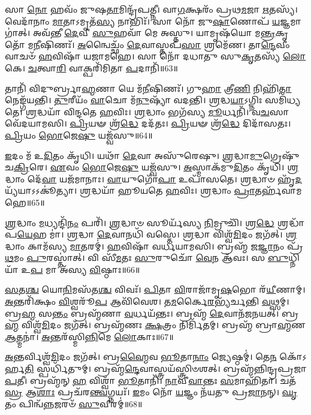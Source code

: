 𑌸𑌾 \ul{𑌨𑍋} 𑌹𑌵𑌂᳴ 𑌜𑍁𑌷\-\ul{𑌤𑌾}\-𑌮𑌿𑌨𑍍𑌦𑍍𑌰᳴𑌪𑌤𑍍𑌨𑍀।
𑌵𑌾\-\ul{𑌗}\-𑌕𑍍𑌷𑌰𑌂᳴ 𑌪𑍍𑌰𑌥\-\ul{𑌮}\-𑌜𑌾 \ul{𑌋}\-𑌤𑌸𑍍𑌯᳴।
𑌵𑍇𑌦𑌾᳴𑌨𑌾𑌂 \ul{𑌮𑌾}\-𑌤𑌾\-𑌽𑌮𑍃𑌤᳴\-\ul{𑌸𑍍𑌯} 𑌨𑌾𑌭𑌿𑌃᳴।
𑌸𑌾 𑌨𑍋᳴ 𑌜𑍁\-\ul{𑌷𑌾}\-𑌣𑍋𑌪᳴ \ul{𑌯}\-𑌜𑍍𑌞𑌮𑌾𑌗𑌾॑𑌤𑍍।
𑌅𑌵᳴𑌨𑍍𑌤𑍀 \ul{𑌦𑍇}\-𑌵𑍀 \ul{𑌸𑍁}\-𑌹𑌵𑌾᳴ 𑌮𑍇 𑌅𑌸𑍍𑌤𑍁।
𑌯𑌾𑌮𑍃𑌷᳴𑌯𑍋 𑌮\-\ul{𑌨𑍍𑌤𑍍𑌰}\-𑌕𑍃𑌤𑍋᳴ 𑌮\-\ul{𑌨𑍀}\-𑌷𑌿𑌣𑌃᳴।
\-\ul{𑌅}\-𑌨𑍍𑌵𑍈𑌚𑍍𑌛𑌂᳴ \ul{𑌦𑍇}\-𑌵𑌾𑌸𑍍𑌤𑌪᳴\-\ul{𑌸𑌾} 𑌶𑍍𑌰𑌮𑍇᳴𑌣।
𑌤𑌾\-\ul{𑌨𑍍𑌦𑍇}\-𑌵𑍀𑌂 𑌵𑌾𑌚𑍞᳴ \ul{𑌹}\-𑌵𑌿𑌷𑌾᳴ 𑌯𑌜𑌾𑌮𑌹𑍇।
𑌸𑌾 𑌨𑍋᳴ 𑌦𑌧𑌾𑌤𑍁 𑌸𑍁\-\ul{𑌕𑍃}\-𑌤𑌸𑍍𑌯᳴ \ul{𑌲𑍋}\-𑌕𑍇।
\-\ul{𑌚}\-𑌤𑍍𑌵𑌾\-\ul{𑌰𑌿} 𑌵𑌾𑌕𑍍𑌪𑌰𑌿᳴𑌮𑌿𑌤𑌾 \ul{𑌪}\-𑌦𑌾𑌨𑌿᳴॥63॥

𑌤𑌾𑌨𑌿᳴ 𑌵𑌿𑌦𑍁𑌰𑍍𑌬𑍍𑌰𑌾\-\ul{𑌹𑍍𑌮}\-𑌣𑌾 𑌯𑍇 𑌮᳴\-\ul{𑌨𑍀}\-𑌷𑌿𑌣𑌃᳴।
𑌗𑍁\-\ul{𑌹𑌾} 𑌤𑍍𑌰𑍀\-\ul{𑌣𑌿} 𑌨𑌿𑌹𑌿᳴\-\ul{𑌤𑌾} 𑌨𑍇𑌙𑍍𑌗᳴𑌯𑌨𑍍𑌤𑌿।
\-\ul{𑌤𑍁}\-𑌰𑍀𑌯𑌂᳴ \ul{𑌵𑌾}\-𑌚𑍋 𑌮᳴\-\ul{𑌨𑍁}\-𑌷𑍍𑌯𑌾᳴ 𑌵𑌦𑌨𑍍𑌤𑌿।
\-\ul{𑌶𑍍𑌰}\-𑌦𑍍𑌧\-\ul{𑌯𑌾}\-\-𑌽𑌗𑍍𑌨𑌿𑌃 𑌸𑌮𑌿᳴𑌧𑍍𑌯𑌤𑍇।
\-\ul{𑌶𑍍𑌰}\-𑌦𑍍𑌧𑌯𑌾᳴ 𑌵𑌿𑌨𑍍𑌦𑌤𑍇 \ul{𑌹}\-𑌵𑌿𑌃।
\-\ul{𑌶𑍍𑌰}\-𑌦𑍍𑌧𑌾𑌂 𑌭𑌗᳴𑌸𑍍𑌯 \ul{𑌮𑍂}\-𑌰𑍍𑌧𑌨𑌿᳴।
𑌵\-\ul{𑌚}\-𑌸𑌾 𑌵𑍇᳴𑌦𑌯𑌾𑌮𑌸𑌿।
\-\ul{𑌪𑍍𑌰𑌿}\-𑌯𑍟 𑌶𑍍𑌰᳴\-\ul{𑌦𑍍𑌧𑍇} 𑌦𑌦᳴𑌤𑌃।
\-\ul{𑌪𑍍𑌰𑌿}\-𑌯𑍟 𑌶𑍍𑌰᳴\-\ul{𑌦𑍍𑌧𑍇} 𑌦𑌿𑌦𑌾᳴𑌸𑌤𑌃।
\-\ul{𑌪𑍍𑌰𑌿}\-𑌯𑌂 \ul{𑌭𑍋}\-𑌜𑍇\-\ul{𑌷𑍁} 𑌯𑌜𑍍𑌵᳴𑌸𑍁॥64॥

\-\ul{𑌇}\-𑌦𑌂 𑌮᳴ 𑌉\-\ul{𑌦𑌿}\-𑌤𑌂 𑌕𑍃᳴𑌧𑌿।
𑌯𑌥𑌾᳴ \ul{𑌦𑍇}\-𑌵𑌾 𑌅𑌸𑍁᳴𑌰𑍇𑌷𑍁।
\-\ul{𑌶𑍍𑌰}\-𑌦𑍍𑌧𑌾\-\ul{𑌮𑍁}\-𑌗𑍍𑌰𑍇𑌷𑍁᳴ 𑌚\-\ul{𑌕𑍍𑌰𑌿}\-𑌰𑍇।
\-\ul{𑌏}\-𑌵𑌂 \ul{𑌭𑍋}\-𑌜𑍇\-\ul{𑌷𑍁} 𑌯𑌜𑍍𑌵᳴𑌸𑍁।
\-\ul{𑌅}\-𑌸𑍍𑌮𑌾𑌕᳴𑌮𑍁\-\ul{𑌦𑌿}\-𑌤𑌂 𑌕𑍃᳴𑌧𑌿।
\-\ul{𑌶𑍍𑌰}\-𑌦𑍍𑌧𑌾𑌂 𑌦𑍇᳴\-\ul{𑌵𑌾} 𑌯𑌜᳴𑌮𑌾𑌨𑌾𑌃।
\-\ul{𑌵𑌾}\-𑌯𑍁𑌗𑍋᳴\-\ul{𑌪𑌾} 𑌉𑌪𑌾᳴𑌸𑌤𑍇।
\-\ul{𑌶𑍍𑌰}\-𑌦𑍍𑌧𑌾𑍞 𑌹𑍃᳴\-\ul{𑌦}\-𑌯𑍍𑌯᳴𑌯𑌾\-𑌽𑌽𑌕𑍂॑𑌤𑍍𑌯𑌾।
\-\ul{𑌶𑍍𑌰}\-𑌦𑍍𑌧𑌯𑌾᳴ 𑌹𑍂𑌯𑌤𑍇 \ul{𑌹}\-𑌵𑌿𑌃।
\-\ul{𑌶𑍍𑌰}\-𑌦𑍍𑌧𑌾𑌂 \ul{𑌪𑍍𑌰𑌾}\-𑌤𑌰𑍍\mbox{}𑌹᳴𑌵𑌾𑌮𑌹𑍇॥65॥

\-\ul{𑌶𑍍𑌰}\-𑌦𑍍𑌧𑌾𑌂 \ul{𑌮}\-𑌧𑍍𑌯𑌨𑍍𑌦𑌿᳴\-\ul{𑌨𑌂} 𑌪𑌰𑌿᳴।
\-\ul{𑌶𑍍𑌰}\-𑌦𑍍𑌧𑌾𑍞 𑌸𑍂𑌰𑍍𑌯᳴𑌸𑍍𑌯 \ul{𑌨𑌿}\-𑌮𑍍𑌰𑍁𑌚𑌿᳴।
𑌶𑍍𑌰\-\ul{𑌦𑍍𑌧𑍇} 𑌶𑍍𑌰𑌦𑍍𑌧𑌾᳴𑌪\-\ul{𑌯𑍇}\-𑌹 𑌮𑌾॑।
\-\ul{𑌶𑍍𑌰}\-𑌦𑍍𑌧𑌾 \ul{𑌦𑍇}\-𑌵𑌾𑌨𑌧𑌿᳴ 𑌵𑌸𑍍𑌤𑍇।
\-\ul{𑌶𑍍𑌰}\-𑌦𑍍𑌧𑌾 𑌵𑌿𑌶𑍍𑌵᳴\-\ul{𑌮𑌿}\-𑌦𑌂 𑌜𑌗᳴𑌤𑍍।
\-\ul{𑌶𑍍𑌰}\-𑌦𑍍𑌧𑌾𑌂 𑌕𑌾𑌮᳴𑌸𑍍𑌯 \ul{𑌮𑌾}\-𑌤𑌰𑌮𑍍॑।
\-\ul{𑌹}\-𑌵𑌿𑌷𑌾᳴ 𑌵𑌰𑍍𑌧𑌯𑌾𑌮𑌸𑌿।
𑌬𑍍𑌰𑌹𑍍𑌮᳴ 𑌜\-\ul{𑌜𑍍𑌞𑌾}\-𑌨𑌂 𑌪𑍍𑌰᳴\-\ul{𑌥}\-𑌮𑌂 \ul{𑌪𑍁}\-𑌰𑌸𑍍𑌤𑌾॑𑌤𑍍।
𑌵𑌿 𑌸𑍀᳴\-\ul{𑌮}\-𑌤𑌃 \ul{𑌸𑍁}\-𑌰𑍁𑌚𑍋᳴ \ul{𑌵𑍇}\-𑌨 𑌆᳴𑌵𑌃।
𑌸 \ul{𑌬𑍁}\-𑌧𑍍𑌨𑌿𑌯𑌾᳴ 𑌉\-\ul{𑌪} 𑌮𑌾 𑌅᳴𑌸𑍍𑌯 \ul{𑌵𑌿}\-𑌷𑍍𑌠𑌾𑌃॥66॥

\-\ul{𑌸}\-𑌤\-\ul{𑌶𑍍𑌚} 𑌯𑍋\-\ul{𑌨𑌿}\-𑌮𑌸᳴𑌤\-\ul{𑌶𑍍𑌚} 𑌵𑌿𑌵𑌃᳴।
\-\ul{𑌪𑌿}\-𑌤𑌾 \ul{𑌵𑌿}\-𑌰𑌾𑌜𑌾᳴𑌮𑍃\-\ul{𑌷}\-𑌭𑍋 𑌰᳴\-\ul{𑌯𑍀}\-𑌣𑌾𑌮𑍍।
\-\ul{𑌅}\-𑌨𑍍𑌤𑌰𑌿᳴𑌕𑍍𑌷𑌂 \ul{𑌵𑌿}\-𑌶𑍍𑌵𑌰𑍂᳴\-\ul{𑌪} 𑌆𑌵𑌿᳴𑌵𑍇𑌶।
𑌤\-\ul{𑌮}\-𑌰𑍍𑌕𑍈\-\ul{𑌰}\-𑌭𑍍𑌯᳴𑌰𑍍𑌚𑌨𑍍𑌤𑌿 \ul{𑌵}\-𑌥𑍍𑌸𑌮𑍍।
𑌬𑍍𑌰\-\ul{𑌹𑍍𑌮} 𑌸\-\ul{𑌨𑍍𑌤𑌂} 𑌬𑍍𑌰𑌹𑍍𑌮᳴𑌣𑌾 \ul{𑌵}\-𑌰𑍍𑌧𑌯᳴𑌨𑍍𑌤𑌃।
𑌬𑍍𑌰𑌹𑍍𑌮᳴ \ul{𑌦𑍇}\-𑌵𑌾𑌨᳴𑌜𑌨𑌯𑌤𑍍।
𑌬𑍍𑌰\-\ul{𑌹𑍍𑌮} 𑌵𑌿𑌶𑍍𑌵᳴\-\ul{𑌮𑌿}\-𑌦𑌂 𑌜𑌗᳴𑌤𑍍।
𑌬𑍍𑌰𑌹𑍍𑌮᳴𑌣𑌃 \ul{𑌕𑍍𑌷}\-𑌤𑍍𑌰𑌂 𑌨𑌿𑌰𑍍𑌮𑌿᳴𑌤𑌮𑍍।
𑌬𑍍𑌰𑌹𑍍𑌮᳴ 𑌬𑍍𑌰𑌾\-\ul{𑌹𑍍𑌮}\-𑌣 \ul{𑌆}\-𑌤𑍍𑌮𑌨𑌾॑।
\-\ul{𑌅}\-𑌨𑍍𑌤𑌰᳴𑌸𑍍𑌮𑌿\-\ul{𑌨𑍍𑌨𑌿}\-𑌮𑍇 \ul{𑌲𑍋}\-𑌕𑌾𑌃॥67॥

\-\ul{𑌅}\-𑌨𑍍𑌤𑌰𑍍𑌵𑌿𑌶𑍍𑌵᳴\-\ul{𑌮𑌿}\-𑌦𑌂 𑌜𑌗᳴𑌤𑍍।
𑌬𑍍𑌰\-\ul{𑌹𑍍𑌮𑍈}\-𑌵 \ul{𑌭𑍂}\-𑌤𑌾\-\ul{𑌨𑌾𑌂} 𑌜𑍍𑌯𑍇𑌷𑍍𑌠𑌮𑍍॑।
𑌤𑍇\-\ul{𑌨} 𑌕𑍋᳴\-𑌽𑌰𑍍\mbox{}𑌹\-\ul{𑌤𑌿} 𑌸𑍍𑌪𑌰𑍍𑌧𑌿᳴𑌤𑍁𑌮𑍍।
𑌬𑍍𑌰𑌹𑍍𑌮᳴\-\ul{𑌨𑍍𑌦𑍇}\-𑌵𑌾𑌸𑍍𑌤𑍍𑌰𑌯᳴𑌸𑍍𑌤𑍍𑌰𑌿𑍞𑌶𑌤𑍍।
𑌬𑍍𑌰𑌹𑍍𑌮᳴𑌨𑍍𑌨𑌿𑌨𑍍𑌦𑍍𑌰𑌪𑍍𑌰𑌜𑌾\-\ul{𑌪}\-𑌤𑍀।
𑌬𑍍𑌰𑌹𑍍𑌮᳴𑌨𑍍 \ul{𑌹} 𑌵𑌿𑌶𑍍𑌵𑌾᳴ \ul{𑌭𑍂}\-𑌤𑌾𑌨𑌿᳴।
\-\ul{𑌨𑌾}\-𑌵𑍀\-\ul{𑌵𑌾}\-𑌨𑍍𑌤𑌃 \ul{𑌸}\-𑌮𑌾𑌹𑌿᳴𑌤𑌾।
𑌚𑌤᳴\-\ul{𑌸𑍍𑌰} 𑌆\-\ul{𑌶𑌾𑌃} 𑌪𑍍𑌰𑌚᳴𑌰\-\ul{𑌨𑍍𑌤𑍍𑌵}\-𑌗𑍍𑌨𑌯𑌃᳴।
\-\ul{𑌇}\-𑌮𑌂 𑌨𑍋᳴ \ul{𑌯}\-𑌜𑍍𑌞𑌂 𑌨᳴𑌯𑌤𑍁 𑌪𑍍𑌰\-\ul{𑌜𑌾}\-𑌨𑌨𑍍।
\-\ul{𑌘𑍃}\-𑌤𑌂 𑌪𑌿𑌨𑍍𑌵᳴\-\ul{𑌨𑍍𑌨}\-𑌜𑌰𑍞᳴ \ul{𑌸𑍁}\-𑌵𑍀𑌰𑌮𑍍॑॥68॥

